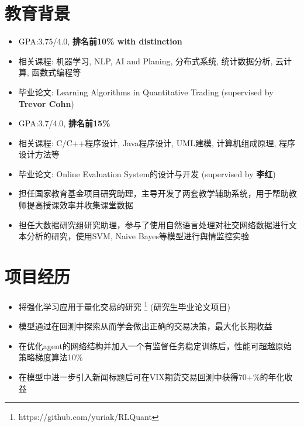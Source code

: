 \documentclass{resume}
\begin{document}
\section{教育背景}

\begin{itemize}
    \item GPA:3.75/4.0, \textbf{排名前10\% with distinction}
    \item 相关课程: 机器学习, NLP, AI and Planing, 分布式系统, 统计数据分析, 云计算, 函数式编程等
    \item 毕业论文: Learning Algorithms in Quantitative Trading (supervised by \textbf{Trevor Cohn})
    
\end{itemize}

\begin{itemize}
    \item GPA:3.7/4.0, \textbf{排名前15\%}
    \item 相关课程: C/C++程序设计, Java程序设计, UML建模, 计算机组成原理, 程序设计方法等
    \item 毕业论文: Online Evaluation System的设计与开发 (supervised by \textbf{李红})
    \item 担任国家教育基金项目研究助理，主导开发了两套教学辅助系统，用于帮助教师提高授课效率并收集课堂数据
    \item 担任大数据研究组研究助理，参与了使用自然语言处理对社交网络数据进行文本分析的研究，使用SVM, Naive Bayes等模型进行舆情监控实验
\end{itemize}

\section{项目经历}
\begin{itemize}
    \item 将强化学习应用于量化交易的研究 \footnote{https://github.com/yuriak/RLQuant} (研究生毕业论文项目)
    \item 模型通过在回测中探索从而学会做出正确的交易决策，最大化长期收益
    \item 在优化agent的网络结构并加入一个有监督任务稳定训练后，性能可超越原始策略梯度算法10\%
    \item 在模型中进一步引入新闻标题后可在VIX期货交易回测中获得70+\%的年化收益
\end{itemize}
\end{document}
